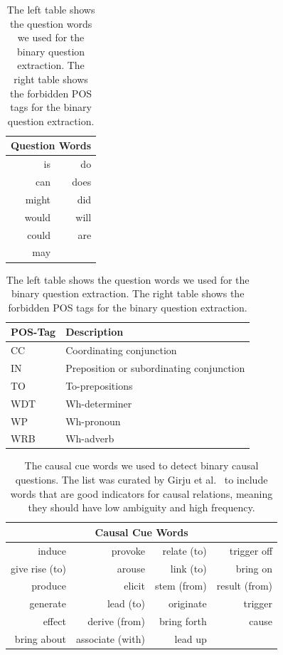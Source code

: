 \begin{table}
\caption{The left table shows the question words we used for the binary question
extraction. The right table shows the forbidden POS tags for the binary question extraction.}
\label{table-questions-pos-tags}
	\centering
	\begin{tabular}{rr}
		\toprule
		\multicolumn{2}{c}{\textbf{Question Words}} \\
		\midrule
		is & do\\
		can  & does\\
		might & did \\
		would & will \\
		could & are\\
		may \\
		\bottomrule
	\end{tabular}
	\quad
	\begin{tabular}{ll}
		\toprule
		\textbf{POS-Tag} & \textbf{Description}\\
		\midrule
		CC & Coordinating conjunction \\
		IN & Preposition or subordinating conjunction \\
		TO & To-prepositions \\
		WDT & Wh-determiner \\
		WP & Wh-pronoun \\
		WRB & Wh-adverb \\
		\bottomrule
	\end{tabular}
\end{table}
\begin{table}
\caption{The causal cue words we used to detect binary causal questions. The list was
		curated by Girju et al.~\cite{Girju2002CausalCue} to include words that are 
		good indicators for causal relations, meaning they should have low ambiguity and high frequency.}
\label{table-cue-words}
\centering
	\begin{tabular}{rrrr}
	\toprule
	\multicolumn{4}{c}{\textbf{Causal Cue Words}} \\
	\midrule
	induce & provoke & relate (to) & trigger off \\
	give rise (to) & arouse & link (to) & bring on \\
	produce & elicit & stem (from)& result (from)\\
	generate & lead (to)& originate & trigger\\
	effect & derive (from)& bring forth& cause \\
	bring about & associate (with)& lead up &\\
	\bottomrule
	\end{tabular}
\end{table}




